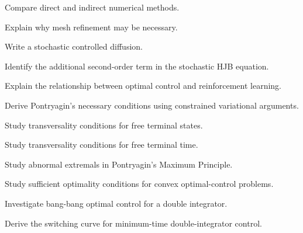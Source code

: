 \begin{exercise}[3]
Compare direct and indirect numerical methods.
\end{exercise}

\begin{exercise}[3]
Explain why mesh refinement may be necessary.
\end{exercise}

\begin{exercise}[3]
Write a stochastic controlled diffusion.
\end{exercise}

\begin{exercise}[3]
Identify the additional second-order term in the stochastic HJB equation.
\end{exercise}

\begin{exercise}[3]
Explain the relationship between optimal control and reinforcement
learning.
\end{exercise}

\begin{exercise}[4]
Derive Pontryagin's necessary conditions using constrained variational
arguments.
\end{exercise}

\begin{exercise}[4]
Study transversality conditions for free terminal states.
\end{exercise}

\begin{exercise}[4]
Study transversality conditions for free terminal time.
\end{exercise}

\begin{exercise}[4]
Study abnormal extremals in Pontryagin's Maximum Principle.
\end{exercise}

\begin{exercise}[4]
Study sufficient optimality conditions for convex optimal-control
problems.
\end{exercise}

\begin{exercise}[4]
Investigate bang-bang optimal control for a double integrator.
\end{exercise}

\begin{exercise}[4]
Derive the switching curve for minimum-time double-integrator control.
\end{exercise}

